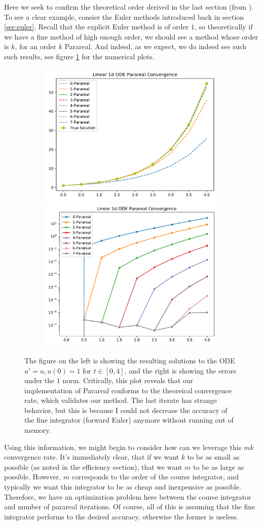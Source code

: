 Here we seek to confirm the theoretical order derived in the last section (from
\cite{balarticle} \cite{fieldstalk}). To see a clear example, consier the Euler
methods introduced back in section \ref{sec:euler}. Recall that the explicit
Euler method is of order $1$, so theoretically if we have a fine method of high
enough order, we should see a method whose order is $k$, for an order $k$
Parareal. And indeed, as we expect, we do indeed see such such results, see
figure \ref{fig:conv_fw} for the numerical plots.

\begin{figure}[!htb]
  \centering
  \begin{subfigure}{\textwidth}
    \centering
    \includegraphics[width=.515\textwidth]
      {./resources/converge_fwsols}
    \includegraphics[width=.475\textwidth]
      {./resources/converge_fwerrs}
  \end{subfigure}%
  \caption{The figure on the left is showing the resulting solutions to the ODE
    $u' = u, u(0) = 1$ for $t \in [0, 4]$, and the right is showing the errors
    under the $1$ norm. Critically, this plot reveals that our implementation of
    Parareal conforms to the theoreical convergence rate, which validates our
    method. The last iterate has strange behavior, but this is because I could
    not decrease the accuracy of the fine integrator (forward Euler) anymore
    without running out of memory.}\label{fig:conv_fw}
\end{figure}

Using this information, we might begin to consider how can we leverage this $mk$
convergence rate. It's immediately clear, that if we want $k$ to be as small as
possible (as noted in the efficiency section), that we want $m$ to be as large
as possible. However, $m$ corresponds to the order of the course integrator, and
typically we want this integrator to be as cheap and inexpensive as possible.
Therefore, we have an optimization problem here between the course integrator
and number of parareal iterations. Of course, all of this is assuming that the
fine integrator performs to the desired accuracy, otherwise the former is
useless. 




